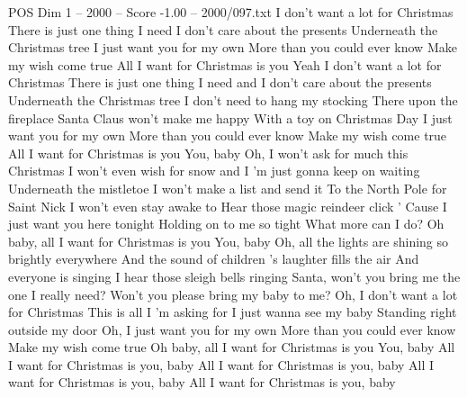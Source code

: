 \begin{textsample}{POS Dim 1 – 2000 – Score -1.00 – 2000/097.txt}  \label{ex:f1_pos_038}
I don't want a lot for Christmas There is just one thing I need I don't care about the presents Underneath the Christmas tree I just want you for my own More than you could ever know Make my wish come true All I want for Christmas is you Yeah I don't want a lot for Christmas There is just one thing I need and I don't care about the presents Underneath the Christmas tree I don't need to hang my stocking There upon the fireplace Santa Claus won't make me happy With a toy on Christmas Day I just want you for my own More than you could ever know Make my wish come true All I want for Christmas is you You, baby Oh, I won't ask for much this Christmas I won't even wish for snow and I 'm just gonna keep on waiting Underneath the mistletoe I won't make a list and send it To the North Pole for Saint Nick I won't even stay awake to Hear those magic reindeer click ' Cause I just want you here tonight Holding on to me so tight What more can I do?
Oh baby, all I want for Christmas is you You, baby Oh, all the lights are shining so brightly everywhere And the sound of children 's laughter fills the air And everyone is singing I hear those sleigh bells ringing Santa, won't you bring me the one I really need?
Won't you please bring my baby to me?
Oh, I don't want a lot for Christmas This is all I 'm asking for I just wanna see my baby Standing right outside my door Oh, I just want you for my own More than you could ever know Make my wish come true Oh baby, all I want for Christmas is you You, baby All I want for Christmas is you, baby All I want for Christmas is you, baby All I want for Christmas is you, baby All I want for Christmas is you, baby

\end{textsample}
